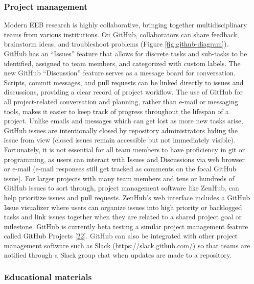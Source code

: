 \hypertarget{project-management}{%
\subsubsection{Project management}\label{project-management}}

Modern EEB research is highly collaborative, bringing together multidisciplinary teams from various institutions.
On GitHub, collaborators can share feedback, brainstorm ideas, and troubleshoot problems (Figure \ref{fig:github-diagram}).
GitHub has an ``Issues'' feature that allows for discrete tasks and sub-tasks to be identified, assigned to team members, and categorized with custom labels.
The new GitHub ``Discussion'' feature serves as a message board for conversation.
Scripts, commit messages, and pull requests can be linked directly to issues and discussions, providing a clear record of project workflow.
The use of GitHub for all project-related conversation and planning, rather than e-mail or messaging tools, makes it easier to keep track of progress throughout the lifespan of a project.
Unlike emails and messages which can get lost as more new tasks arise, GitHub issues are intentionally closed by repository administrators hiding the issue from view (closed issues remain accessible but not immediately visible).
Fortunately, it is not essential for all team members to have proficiency in git or programming, as users can interact with Issues and Discussions via web browser or e-mail (e-mail responses still get tracked as comments on the focal GitHub issue).
For larger projects with many team members and tens or hundreds of GitHub issues to sort through, project management software like ZenHub, can help prioritize issues and pull requests.
ZenHub's web interface includes a GitHub Issue visualizer where users can organize issues into high priority or backlogged tasks and link issues together when they are related to a shared project goal or milestone.
GitHub is currently beta testing a similar project management feature called GitHub Projects {[}\protect\hyperlink{ref-RhBKe0MG}{22}{]}. GitHub can also be integrated with other project management software such as Slack (https://slack.github.com/) so that teams are notified through a Slack group chat when updates are made to a repository.

\hypertarget{educational-materials}{%
\subsubsection{Educational materials}\label{educational-materials}}


